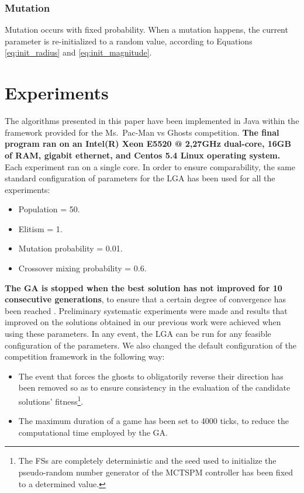 \documentclass[journal]{IEEEtran}
\begin{document}
\subsubsection{Mutation}
Mutation occurs with fixed probability. When a mutation happens, the current parameter is re-initialized to a random value, according to Equations \eqref{eq:init_radius} and \eqref{eq:init_magnitude}.

\section{Experiments}
\label{sec:Experiments}
The algorithms presented in this paper have been implemented in Java within the framework provided for the Ms.\  Pac-Man vs Ghosts competition. \textbf{The final program ran on an Intel(R) Xeon E5520 @ 2,27GHz dual-core, 16GB of RAM, gigabit ethernet, and Centos 5.4 Linux operating system.} Each experiment ran on a single core. In order to ensure comparability, the same standard configuration of parameters for the LGA has been used for all the experiments:

\begin{itemize}
  \item Population = 50.
  \item Elitism = 1.
  \item Mutation probability = 0.01.
  \item Crossover mixing probability = 0.6.
\end{itemize}

\textbf{The GA is stopped when the best solution has not improved for 10 consecutive generations}, to ensure that a certain degree of convergence has been reached \cite{Karma2003, Safe2004}. Preliminary systematic experiments were made and results that improved on the solutions obtained in our previous work \cite{Liberatore2014} were achieved when using these parameters. In any event, the LGA can be run for any feasible configuration of the parameters.  We also changed the default configuration of the competition framework in the following way:

\begin{itemize}
  \item The event that forces the ghosts to obligatorily reverse their direction has been removed so as to ensure consistency in the evaluation of the candidate solutions' fitness\footnote{The FSs are completely deterministic and the seed used to initialize the pseudo-random number generator of the MCTSPM controller has been fixed to a determined value.}.
  \item The maximum duration of a game has been set to 4000 ticks, to reduce the computational time employed by the GA.
\end{itemize}
\end{document}
